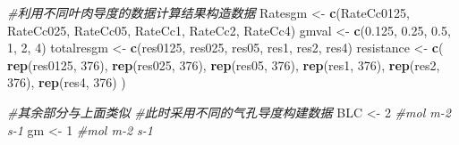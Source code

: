 \documentclass[
]{krantz}
\makeatletter
\newenvironment{Shaded}{\begin{snugshade}}{\end{snugshade}}
\newcommand{\CommentTok}[1]{\textcolor[rgb]{0.56,0.35,0.01}{\textit{#1}}}
\newcommand{\DecValTok}[1]{\textcolor[rgb]{0.00,0.00,0.81}{#1}}
\newcommand{\FloatTok}[1]{\textcolor[rgb]{0.00,0.00,0.81}{#1}}
\newcommand{\KeywordTok}[1]{\textcolor[rgb]{0.13,0.29,0.53}{\textbf{#1}}}
\newcommand{\NormalTok}[1]{#1}
\newcommand{\StringTok}[1]{\textcolor[rgb]{0.31,0.60,0.02}{#1}}
\newenvironment{kframe}{%
\medskip{}
\setlength{\fboxsep}{.8em}
 \def\at@end@of@kframe{}%
 \ifinner\ifhmode%
  \def\at@end@of@kframe{\end{minipage}}%
  \begin{minipage}{\columnwidth}%
 \fi\fi%
 \def\FrameCommand##1{\hskip\@totalleftmargin \hskip-\fboxsep
 \colorbox{shadecolor}{##1}\hskip-\fboxsep
     \hskip-\linewidth \hskip-\@totalleftmargin \hskip\columnwidth}%
 \MakeFramed {\advance\hsize-\width
   \@totalleftmargin\z@ \linewidth\hsize
   \@setminipage}}%
 {\par\unskip\endMakeFramed%
 \at@end@of@kframe}
\renewenvironment{Shaded}{\begin{kframe}}{\end{kframe}}
\makeatother
\begin{document}
\begin{Shaded}
\begin{Highlighting}[]
\CommentTok{#利用不同叶肉导度的数据计算结果构造数据}
\NormalTok{Ratesgm <-}
\StringTok{  }\KeywordTok{c}\NormalTok{(RateCc0125, RateCc025, RateCc05, RateCc1, RateCc2, RateCc4)}
\NormalTok{gmval <-}\StringTok{ }\KeywordTok{c}\NormalTok{(}\FloatTok{0.125}\NormalTok{, }\FloatTok{0.25}\NormalTok{, }\FloatTok{0.5}\NormalTok{, }\DecValTok{1}\NormalTok{, }\DecValTok{2}\NormalTok{, }\DecValTok{4}\NormalTok{)}
\NormalTok{totalresgm <-}\StringTok{ }\KeywordTok{c}\NormalTok{(res0125, res025, res05, res1, res2, res4)}
\NormalTok{resistance <-}
\StringTok{  }\KeywordTok{c}\NormalTok{(}
    \KeywordTok{rep}\NormalTok{(res0125, }\DecValTok{376}\NormalTok{),}
    \KeywordTok{rep}\NormalTok{(res025, }\DecValTok{376}\NormalTok{),}
    \KeywordTok{rep}\NormalTok{(res05, }\DecValTok{376}\NormalTok{),}
    \KeywordTok{rep}\NormalTok{(res1, }\DecValTok{376}\NormalTok{),}
    \KeywordTok{rep}\NormalTok{(res2, }\DecValTok{376}\NormalTok{),}
    \KeywordTok{rep}\NormalTok{(res4, }\DecValTok{376}\NormalTok{)}
\NormalTok{  )}

\CommentTok{#其余部分与上面类似}
\CommentTok{#此时采用不同的气孔导度构建数据}
\NormalTok{BLC <-}\StringTok{ }\DecValTok{2} \CommentTok{#mol m-2 s-1}
\NormalTok{gm <-}\StringTok{ }\DecValTok{1} \CommentTok{#mol m-2 s-1}


\end{Highlighting}
\end{Shaded}
\end{document}
